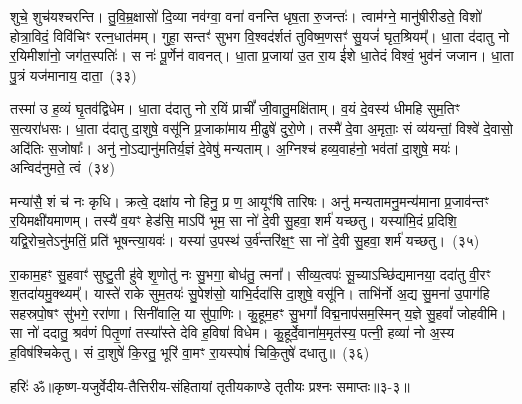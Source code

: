 शुचे॒ शुच॑यश्चरन्ति। तु॒वि॒म्र॒क्षासो॑ दि॒व्या नव॑ग्वा॒ वना॑ वनन्ति धृष॒ता रु॒जन्तः॑। त्वाम॑ग्ने॒ मानु॑षीरीडते॒ विशो॑ होत्रा॒विदं॒ विवि॑चिꣳ रत्न॒धात॑मम्। गुहा॒ सन्तꣳ॑ सुभग वि॒श्वद॑र्\mbox{}शतं तुविष्म॒णसꣳ॑ सु॒यजं॑ घृत॒श्रियम्᳚। धा॒ता द॑दातु नो र॒यिमीशा॑नो॒ जग॑त॒स्पतिः॑। स नः॑ पू॒र्णेन॑ वावनत्। धा॒ता प्र॒जाया॑ उ॒त रा॒य ई॑शे धा॒तेदं विश्वं॒ भुव॑नं जजान। धा॒ता पु॒त्रं यज॑मानाय॒ दाता॒~(३३)\ip

तस्मा॑ उ ह॒व्यं घृ॒तव॑द्विधेम। धा॒ता द॑दातु नो र॒यिं प्राचीं᳚ जी॒वातु॒मक्षि॑ताम्। व॒यं दे॒वस्य॑ धीमहि सुम॒तिꣳ स॒त्यरा॑धसः। धा॒ता द॑दातु दा॒शुषे॒ वसू॑नि प्र॒जाका॑माय मी॒ढुषे॑ दुरो॒णे। तस्मै॑ दे॒वा अ॒मृताः॒ सं व्य॑यन्तां॒ विश्वे॑ दे॒वासो॒ अदि॑तिः स॒जोषाः᳚। अनु॑ नो॒\-ऽद्यानु॑मतिर्य॒ज्ञं दे॒वेषु॑ मन्यताम्। अ॒ग्निश्च॑ हव्य॒वाह॑नो॒ भव॑तां दा॒शुषे॒ मयः॑। अन्विद॑नुमते॒ त्वं~(३४)\ip

मन्या॑सै॒ शं च॑ नः कृधि। क्रत्वे॒ दक्षा॑य नो हिनु॒ प्र ण॒ आयूꣳ॑षि तारिषः। अनु॑ मन्यतामनु॒मन्य॑माना प्र॒जाव॑न्तꣳ र॒यिमक्षी॑यमाणम्। तस्यै॑ व॒यꣳ हेड॑सि॒ मा\-ऽपि॑ भूम॒ सा नो॑ दे॒वी सु॒हवा॒ शर्म॑ यच्छतु। यस्या॑मि॒दं प्र॒दिशि॒ यद्वि॒रोच॒ते\-ऽनु॑मतिं॒ प्रति॑ भूषन्त्या॒यवः॑। यस्या॑ उ॒पस्थ॑ उ॒र्व॑न्तरि॑क्ष॒ꣳ॒ सा नो॑ दे॒वी सु॒हवा॒ शर्म॑ यच्छतु।~(३५)\ip

रा॒काम॒हꣳ सु॒हवाꣳ॑ सुष्टु॒ती हु॑वे शृ॒णोतु॑ नः सु॒भगा॒ बोध॑तु॒ त्मना᳚। सीव्य॒त्वपः॑ सू॒च्या\-ऽच्छि॑द्यमानया॒ ददा॑तु वी॒रꣳ श॒तदा॑यमु॒क्थ्यम्᳚। यास्ते॑ राके सुम॒तयः॑ सु॒पेश॑सो॒ याभि॒र्ददा॑सि दा॒शुषे॒ वसू॑नि। ताभि॑र्नो अ॒द्य सु॒मना॑ उ॒पाग॑हि सहस्रपो॒षꣳ सु॑भगे॒ ररा॑णा। सिनी॑वालि॒ या सु॑पा॒णिः। कु॒हूम॒हꣳ सु॒भगां᳚ विद्म॒नाप॑सम॒स्मिन् य॒ज्ञे सु॒हवां᳚ जोहवीमि। सा नो॑ ददातु॒ श्रव॑णं पितृ॒णां तस्या᳚स्ते देवि ह॒विषा॑ विधेम। कु॒हूर्दे॒वाना॑म॒मृत॑स्य॒ पत्नी॒ हव्या॑ नो अ॒स्य ह॒विष॑श्चिकेतु। सं दा॒शुषे॑ कि॒रतु॒ भूरि॑ वा॒मꣳ रा॒यस्पोषं॑ चिकि॒तुषे॑ दधातु॥~(३६)\ip

{\anuvakamend[{भामा॑सो॒ दाता॒ त्वम॒न्तरि॑क्ष॒ꣳ॒ सा नो॑ दे॒वी सु॒हवा॒ शर्म॑ यच्छतु॒ श्रव॑णं॒ चतु॑र्विꣳशतिश्च}]}%

{हरिः॑ ॐ}{॥कृष्ण-यजुर्वेदीय-तैत्तिरीय-संहितायां तृतीयकाण्डे तृतीयः प्रश्नः समाप्तः॥३-३॥}


